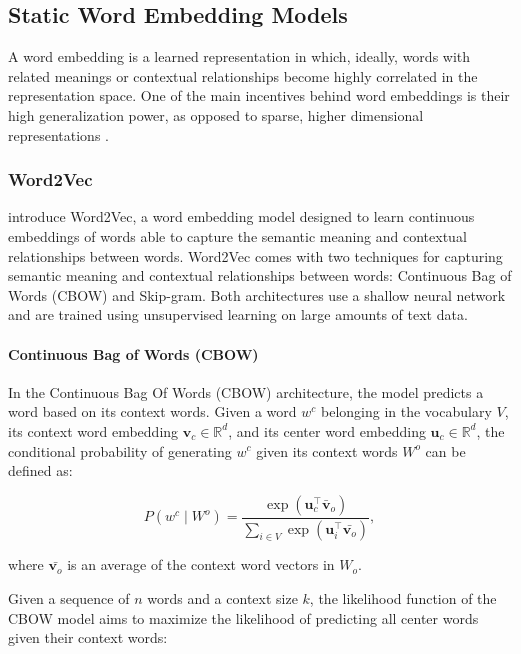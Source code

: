 \subsection{Static Word Embedding Models}

A word embedding is a learned representation in which, ideally, words with related meanings or contextual relationships become highly correlated in the representation space. One of the main incentives behind word embeddings is their high generalization power, as opposed to sparse, higher dimensional representations \citep{bengio2000neural}.

\subsubsection{Word2Vec}

\citet{mikolov2013efficient} introduce Word2Vec, a word embedding model designed to learn continuous embeddings of words able to capture the semantic meaning and contextual relationships between words. Word2Vec comes with two techniques for capturing semantic meaning and contextual relationships between words: Continuous Bag of Words (CBOW) and Skip-gram. Both architectures use a shallow neural network and are trained using unsupervised learning on large amounts of text data.

\paragraph{Continuous Bag of Words (CBOW)} 
In the Continuous Bag Of Words (CBOW) architecture, the model predicts a word based on its context words. Given a word $w^c$ belonging in the vocabulary $V$, its context word embedding $\bm{v}_c \in \mathbb{R}^{d}$, and its center word embedding $\bm{u}_c \in \mathbb{R}^{d}$, the conditional probability of generating $w^c$ given its context words $W^o$ can be defined as:

\begin{equation}
    P(w^c \mid W^o) = \frac{\exp(\bm{u}_c^{\top}\bar{\bm{v}}_o)}{\sum_{i \in V} \exp(\bm{u}_{i}^{\top}\bar{\bm{v}_o})},
\end{equation}

where $\bar{\bm{v}_o}$ is an average of the context word vectors in $W_o$.

Given a sequence of $n$ words and a context size $k$, the likelihood function of the CBOW model aims to maximize the likelihood of predicting all center words given their context words:

